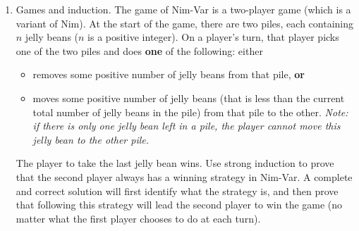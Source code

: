 \begin{enumerate}[labelindent=0pt, leftmargin=0pt]
\begin{enumerate}
\item
Translate the statement to English, state whether is it true or false, and then justify your answer (by proving the statement or its negation).
$$\forall s \in S~ (rnalen(s) > basecount( ~(s,\A)~))$$

\item 
Translate the statement to English, state whether is it true or false, and then justify your answer (by proving the statement or its negation).
$$\forall s \in S~ \forall b \in B ~( basecount( ~(s,b)~) > 0)$$

\end{enumerate}
   \item Games and induction.  The game of Nim-Var is a two-player game (which is a variant of Nim).
    At the start of the game, there are two piles, each containing $n$ 
    jelly beans
    ($n$ is a positive integer).  On a player's turn, that player picks one 
    of the two piles and does {\bf one} of the following: either
    \begin{itemize}
    \item removes some positive number of jelly beans from that pile, {\bf or}
    \item moves some positive number of jelly beans (that is less than the
    current total number of jelly beans in the pile) from that pile to the other.  
    {\it Note: if there is only one jelly bean left in a pile, the player cannot move
    this jelly bean to the other pile.}
    \end{itemize}
    The player to take the last jelly bean wins.  
    Use strong induction to prove that the second player always has a winning strategy in Nim-Var.
    A complete and correct solution will first identify what the strategy is, and then prove that 
    following this strategy will lead the second player to win the game (no matter what the first 
    player chooses to do at each turn).
    
    
    

\end{enumerate}
